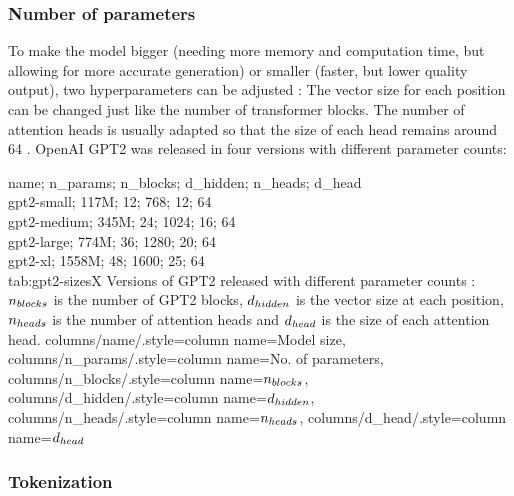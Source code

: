 
\subsubsection{Number of parameters}

\label{gpt2:parameters}

To make the model bigger (needing more memory and computation time, but allowing for more accurate generation) or smaller (faster, but lower quality output), two hyperparameters can be adjusted  : The vector size for each position can be changed just like the number of transformer blocks. The number of attention heads is usually adapted so that the size of each head remains around 64  \cite{hfpretrained}.
OpenAI GPT2 was released in four versions with different parameter counts:

{
	name; n_params; n_blocks; d_hidden; n_heads; d_head\\
	gpt2-small; 117M; 12; 768; 12; 64 \\
	gpt2-medium; 345M; 24; 1024; 16; 64 \\
	gpt2-large; 774M; 36; 1280; 20; 64 \\
	gpt2-xl; 1558M; 48; 1600; 25; 64 \\
}
{tab:gpt2-sizesX}
{
	Versions of GPT2 released with different parameter counts \cite{hfpretrained}: ${n_{blocks}}$ is the number of GPT2 blocks, ${d_{hidden}}$ is the vector size at each position, ${n_{heads}}$ is the number of attention heads and ${d_{head}}$ is the size of each attention head.
}
{%
	columns/name/.style={column name={Model size}},
	columns/n_params/.style={column name={No. of parameters}},
	columns/n_blocks/.style={column name={${n_{blocks}}$}},
	columns/d_hidden/.style={column name={${d_{hidden}}$}},
	columns/n_heads/.style={column name={${n_{heads}}$}},
	columns/d_head/.style={column name={${d_{head}}$}}
}


\subsubsection{Tokenization}

